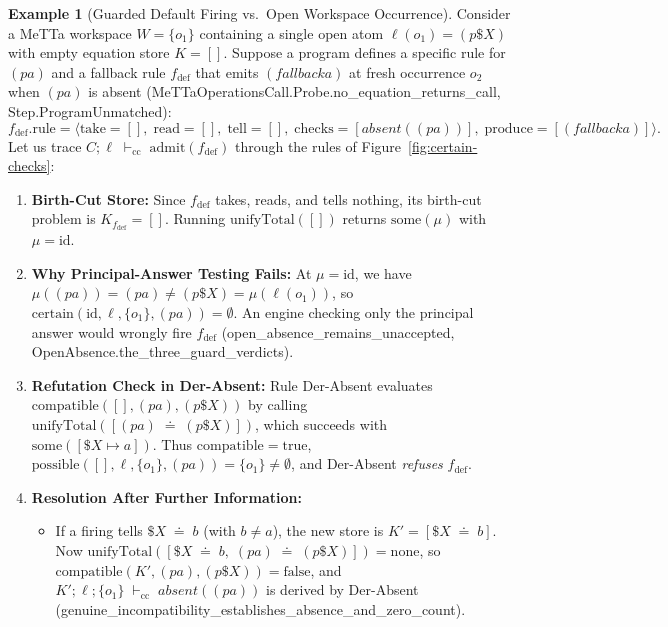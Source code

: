 \documentclass[11pt,a4paper]{article}
\theoremstyle{definition}
\newtheorem{example}[theorem]{Example}
\DeclareRobustCommand{\lean}[1]{%
  \ifmmode\text{\normalfont\ttfamily\footnotesize\detokenize{#1}}%
  \else{\normalfont\footnotesize\leanurl{#1}}\fi}
\DeclareRobustCommand{\metta}[1]{\text{\normalfont\ttfamily\footnotesize #1}}
\DeclareRobustCommand{\RuleName}[1]{\text{\normalfont\scshape\small #1}}
\def\lean#1{#1}%
\def\metta#1{#1}%
\def\RuleName#1{#1}%
\newcommand{\ccseq}{\;\vdash_{\mathrm{cc}}\;}
\newcommand{\doteqStore}{\;\doteq\;}
\begin{document}
\begin{example}[Guarded Default Firing vs.\ Open Workspace Occurrence]
\label{ex:worked-absence}
Consider a MeTTa workspace $W = \{o_1\}$ containing a single open atom $\ell(o_1) = \metta{(p \$X)}$ with empty equation store $K = []$. Suppose a program defines a specific rule for $\metta{(p a)}$ and a fallback rule $f_{\mathrm{def}}$ that emits $\metta{(fallback a)}$ at fresh occurrence $o_2$ when $\metta{(p a)}$ is absent (\lean{MeTTaOperationsCall.Probe.no_equation_returns_call}, \lean{Step.ProgramUnmatched}):
\[
  f_{\mathrm{def}}.\mathrm{rule} = \big\langle \mathrm{take}=[],\; \mathrm{read}=[],\; \mathrm{tell}=[],\; \mathrm{checks}=[\metta{absent}(\metta{(p a)})],\; \mathrm{produce}=[\metta{(fallback a)}] \big\rangle.
\]
Let us trace $C; \ell \ccseq \mathrm{admit}(f_{\mathrm{def}})$ through the rules of Figure~\ref{fig:certain-checks}:
\begin{enumerate}[leftmargin=2em, nosep]
  \item \textbf{Birth-Cut Store:} Since $f_{\mathrm{def}}$ takes, reads, and tells nothing, its birth-cut problem is $K_{f_{\mathrm{def}}} = []$. Running $\mathrm{unifyTotal}([])$ returns $\mathrm{some}(\mu)$ with $\mu = \mathrm{id}$.
  \item \textbf{Why Principal-Answer Testing Fails:} At $\mu = \mathrm{id}$, we have $\mu(\metta{(p a)}) = \metta{(p a)} \neq \metta{(p \$X)} = \mu(\ell(o_1))$, so $\mathrm{certain}(\mathrm{id}, \ell, \{o_1\}, \metta{(p a)}) = \emptyset$. An engine checking only the principal answer would wrongly fire $f_{\mathrm{def}}$ (\lean{open_absence_remains_unaccepted}, \lean{OpenAbsence.the_three_guard_verdicts}).
  \item \textbf{Refutation Check in \RuleName{Der-Absent}:} Rule \RuleName{Der-Absent} evaluates $\mathrm{compatible}([], \metta{(p a)}, \metta{(p \$X)})$ by calling $\mathrm{unifyTotal}([\metta{(p a)} \doteqStore \metta{(p \$X)}])$, which succeeds with $\mathrm{some}([\$X \mapsto \metta{a}])$. Thus $\mathrm{compatible} = \mathrm{true}$, $\mathrm{possible}([], \ell, \{o_1\}, \metta{(p a)}) = \{o_1\} \neq \emptyset$, and \RuleName{Der-Absent} \emph{refuses} $f_{\mathrm{def}}$.
  \item \textbf{Resolution After Further Information:}
  \begin{itemize}[nosep]
    \item If a firing tells $\$X \doteqStore \metta{b}$ (with $\metta{b} \neq \metta{a}$), the new store is $K' = [\$X \doteqStore \metta{b}]$. Now $\mathrm{unifyTotal}([\$X \doteqStore \metta{b},\; \metta{(p a)} \doteqStore \metta{(p \$X)}]) = \mathrm{none}$, so $\mathrm{compatible}(K', \metta{(p a)}, \metta{(p \$X)}) = \mathrm{false}$, and $K'; \ell; \{o_1\} \ccseq \metta{absent}(\metta{(p a)})$ is derived by \RuleName{Der-Absent} (\lean{genuine_incompatibility_establishes_absence_and_zero_count}).

\end{itemize}
\end{enumerate}
\end{example}
\end{document}
